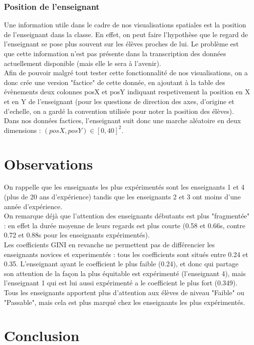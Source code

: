 \documentclass{article}
\begin{document}
\subsubsection{Position de l'enseignant}
Une information utile dans le cadre de nos visualisations spatiales est la position de l'enseignant dans la classe. En effet, on peut faire l'hypothèse que le regard de l'enseignant se pose plus souvent sur les élèves proches de lui. Le problème est que cette information n'est pas présente dans la transcription des données actuellement disponible (mais elle le sera à l'avenir).\\
Afin de pouvoir malgré tout tester cette fonctionnalité de nos visualisations, on a donc crée une version "factice" de cette donnée, en ajoutant à la table des évènements deux colonnes posX et posY indiquant respetivement la position en X et en Y de l'enseignant (pour les questions de direction des axes, d'origine et d'echelle, on a gardé la convention utilisée pour noter la position des élèves). Dans nos données factices, l'enseignant suit donc une marche aléatoire en deux dimensions : $(posX, posY) \in [0, 40]^2$.

\section{Observations}
On rappelle que les enseignants les plus expérimentés sont les enseignants 1 et 4 (plus de 20 ans d'expérience) tandis que les enseignants 2 et 3 ont moins d'une année d'expérience.\\
On remarque déjà que l'attention des enseignants débutants est plus "fragmentée" : en effet la durée moyenne de leurs regards est plus courte (0.58 et 0.66s, contre 0.72 et 0.88s pour les enseignants expérimentés).\\
Les coefficients GINI en revanche ne permettent pas de différencier les enseignants novices et experimentés : tous les coefficients sont situés entre 0.24 et 0.35. L'enseignant ayant le coefficient le plus faible (0.24), et donc qui partage son attention de la façon la plus équitable est expérimenté (l'enseignant 4), mais l'enseignant 1 qui est lui aussi expérimenté a le coefficient le plus fort (0.349).\\
Tous les enseignants apportent plus d'attention aux élèves de niveau "Faible" ou "Passable", mais cela est plus marqué chez les enseignants les plus expérimentés.

\section{Conclusion}

{}

\end{document}
